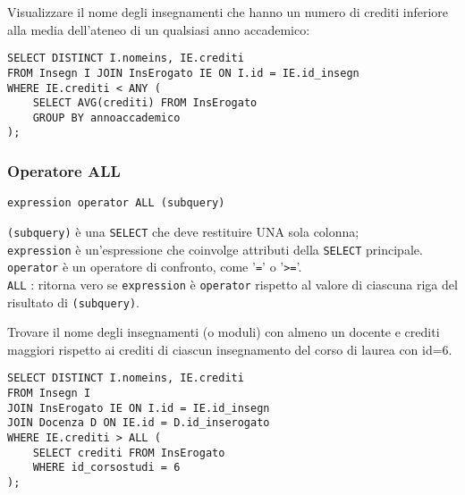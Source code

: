 \documentclass[a4paper, 10pt]{article}
\begin{document}
		Visualizzare il nome degli insegnamenti che hanno un numero di crediti
		inferiore alla media dell’ateneo di un qualsiasi anno accademico:
		\begin{lstlisting}
SELECT DISTINCT I.nomeins, IE.crediti
FROM Insegn I JOIN InsErogato IE ON I.id = IE.id_insegn
WHERE IE.crediti < ANY (
    SELECT AVG(crediti) FROM InsErogato
    GROUP BY annoaccademico
);
		\end{lstlisting}
		
	\subsubsection{Operatore ALL}
		\begin{lstlisting}
expression operator ALL (subquery)
		\end{lstlisting}
		\noindent
		\lstinline|(subquery)| è una \lstinline|SELECT| che deve restituire UNA sola colonna;\\
		\lstinline|expression| è un’espressione che coinvolge attributi della \lstinline|SELECT|
		principale.\\
		\lstinline|operator| è un operatore di confronto, come ’\lstinline|=|’ o ’\lstinline|>=|’.\\
		\lstinline|ALL| : ritorna vero se \lstinline|expression| è \lstinline|operator| rispetto al valore di ciascuna riga del risultato di \lstinline|(subquery)|.
		
		Trovare il nome degli insegnamenti (o moduli) con almeno un docente e
		crediti maggiori rispetto ai crediti di ciascun insegnamento del corso di laurea
		con id=6.
		\begin{lstlisting}
SELECT DISTINCT I.nomeins, IE.crediti
FROM Insegn I
JOIN InsErogato IE ON I.id = IE.id_insegn
JOIN Docenza D ON IE.id = D.id_inserogato
WHERE IE.crediti > ALL (
    SELECT crediti FROM InsErogato
    WHERE id_corsostudi = 6
);
		\end{lstlisting}
		
\end{document}
